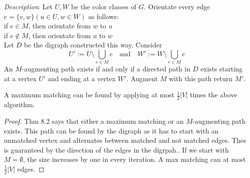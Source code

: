 \emph{Description}: Let $U,W$ be the color classes of $G$. Orientate every edge $e=\{v,w\} (u \in U, w \in W)$ as follows: \\
if $e \in M$, then orientate from $w$ to $u$ \\
if $e \notin M$, then orientate from $u$ to $w$ \\
Let $D$ be the digraph constructed this way. Consider \[ U':=U \setminus \bigcup\limits_{e \in M}e \quad \text{and} \quad W':=W \setminus \bigcup\limits_{e \in M}e \]An $M$-augmenting path exists if and only if a directed path in $D$ exists starting at a vertex $U'$ and ending at a vertex $W'$. Augment $M$ with this path return $M'$.

\begin{thm}
A maximum matching can be found by applying at most $\frac{1}{2} |V| $ times the above algorithm.
\end{thm}
\begin{proof} Thm 8.2 %
says that either a maximum matching or an $M$-augmenting path exists. This path can be found by the digraph as it has to start with an unmatched vertex and alternates between matched and not matched edges. Thes is guaranteed by the direction of the edges in the digrpah.. If we start with $M = \emptyset$, the size increases by one in every iteration. A max matching can at most $\frac{1}{2} |V|$ edges.
\end{proof}

